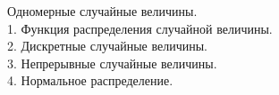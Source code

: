 
Одномерные случайные величины. \\

1. Функция распределения случайной величины. \\


2. Дискретные случайные величины. \\


3. Непрерывные случайные величины. \\


4. Нормальное распределение. \\
